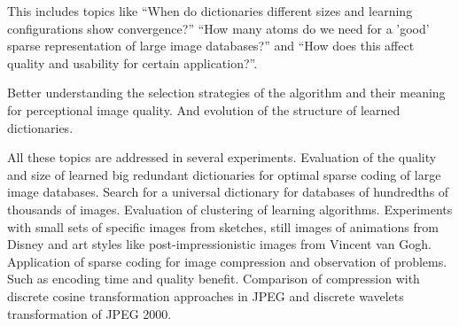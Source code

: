 This includes topics like 
``When do dictionaries different sizes and learning configurations show
convergence?'' 
``How many atoms do we need for a 'good' sparse representation of large image
databases?''  and 
``How does this affect quality and usability for certain application?''. 

Better understanding the selection strategies of the algorithm and their
meaning for perceptional image quality. And evolution of the structure of
learned dictionaries. 

All these topics are addressed in several experiments.
Evaluation of the quality and size of learned big redundant dictionaries
for optimal sparse coding of large image databases.   Search for a universal
dictionary for databases of hundredths of thousands of images. Evaluation of
clustering of learning algorithms. Experiments with small sets of specific
images from sketches, still images of animations from Disney and art styles like
post-impressionistic images from Vincent van Gogh.
Application of sparse coding for image compression and observation of problems.
Such as encoding time and quality benefit. Comparison of compression with
discrete cosine transformation approaches in JPEG and discrete wavelets
transformation of JPEG 2000.




